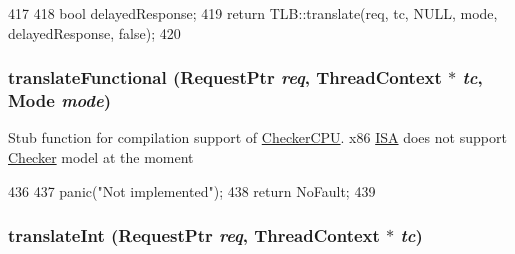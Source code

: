 \begin{DoxyCode}
417 {
418     bool delayedResponse;
419     return TLB::translate(req, tc, NULL, mode, delayedResponse, false);
420 }
\end{DoxyCode}
\hypertarget{classX86ISA_1_1TLB_a26658814c6c9034665aae19cf25545bb}{
\subsubsection[{translateFunctional}]{ translateFunctional ({\bf RequestPtr} {\em req}, \/  {\bf ThreadContext} $\ast$ {\em tc}, \/  {\bf Mode} {\em mode})}}
\label{classX86ISA_1_1TLB_a26658814c6c9034665aae19cf25545bb}
Stub function for compilation support of \hyperlink{classCheckerCPU}{CheckerCPU}. x86 \hyperlink{classX86ISA_1_1ISA}{ISA} does not support \hyperlink{classChecker}{Checker} model at the moment 


\begin{DoxyCode}
436 {
437     panic("Not implemented\n");
438     return NoFault;
439 }
\end{DoxyCode}
\hypertarget{classX86ISA_1_1TLB_ad195b09fbba19be819ba87ce931fc31d}{
\subsubsection[{translateInt}]{ translateInt ({\bf RequestPtr} {\em req}, \/  {\bf ThreadContext} $\ast$ {\em tc})}}
\label{classX86ISA_1_1TLB_ad195b09fbba19be819ba87ce931fc31d}



